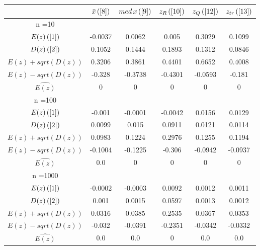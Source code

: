 \begin{tabular}{|c|c|c|c|c|c|}
\hline
 & $\bar{x} \, (\ref{8})$ & $med \, x \, (\ref{9})$ & $z_R \, (\ref{10})$ & $z_Q \, (\ref{12})$ & $z_{tr} \, (\ref{13})$ \\
\hline
n =10 &  &  &  &  & \\
\hline
$E(z) \, (\ref{1})$ & -0.0037 & 0.0062 & 0.005 & 0.3029 & 0.1099\\
\hline
$D(z) \, (\ref{2})$ & 0.1052 & 0.1444 & 0.1893 & 0.1312 & 0.0846\\
\hline
$E(z)+sqrt(D(z))$ & 0.3206 & 0.3861 & 0.4401 & 0.6652 & 0.4008\\
\hline
$E(z)-sqrt(D(z))$ & -0.328 & -0.3738 & -0.4301 & -0.0593 & -0.181\\
\hline
$\hat{E(z)}$ & 0 & 0 & 0 & 0 & 0\\
\hline
n =100 &  &  &  &  & \\
\hline
$E(z) \, (\ref{1})$ & -0.001 & -0.0001 & -0.0042 & 0.0156 & 0.0129\\
\hline
$D(z) \, (\ref{2})$ & 0.0099 & 0.015 & 0.0911 & 0.0121 & 0.0114\\
\hline
$E(z)+sqrt(D(z))$ & 0.0983 & 0.1224 & 0.2976 & 0.1255 & 0.1194\\
\hline
$E(z)-sqrt(D(z))$ & -0.1004 & -0.1225 & -0.306 & -0.0942 & -0.0937\\
\hline
$\hat{E(z)}$ & 0.0 & 0 & 0 & 0 & 0\\
\hline
n =1000 &  &  &  &  & \\
\hline
$E(z) \, (\ref{1})$ & -0.0002 & -0.0003 & 0.0092 & 0.0012 & 0.0011\\
\hline
$D(z) \, (\ref{2})$ & 0.001 & 0.0015 & 0.0597 & 0.0013 & 0.0012\\
\hline
$E(z)+sqrt(D(z))$ & 0.0316 & 0.0385 & 0.2535 & 0.0367 & 0.0353\\
\hline
$E(z)-sqrt(D(z))$ & -0.032 & -0.0391 & -0.2351 & -0.0342 & -0.0332\\
\hline
$\hat{E(z)}$ & 0.0 & 0.0 & 0 & 0.0 & 0.0\\
\hline
\end{tabular}